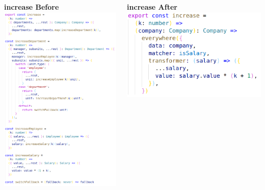 \documentclass[14pt]{beamer}
\begin{document}
\begin{frame}
  \begin{columns}
    \begin{column}{.5\textwidth}
      \vspace{1em}
      \textbf{increase Before}
      \includegraphics[height=0.7\textheight,width=\textwidth,keepaspectratio]{graphics/increase-naive-ts.png}
    \end{column}
    \begin{column}{.5\textwidth}
      \vspace{1em}
      \textbf{increase After}
      \includegraphics[height=0.7\textheight,width=\textwidth,keepaspectratio]{graphics/increase-ts.png}

\end{column}
\end{columns}
\end{frame}
\end{document}
